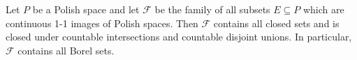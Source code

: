 Let $P$ be a Polish space and let $\mathcal{F}$ be the family of all subsets $E \subseteq P$ which are continuous 1-1 images of Polish spaces. Then $\mathcal{F}$ contains all closed sets and is closed under countable intersections and countable disjoint unions. In particular, $\mathcal{F}$ contains all Borel sets.
